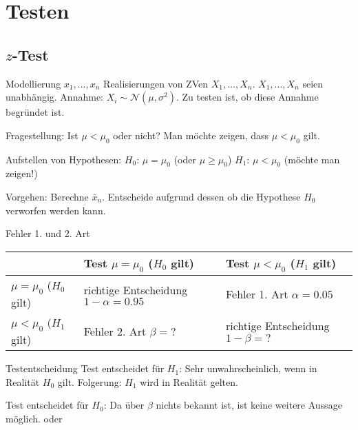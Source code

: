 \section{Testen}

\subsection{\(z\)-Test}

\begin{karte}{Modellierung}
\(x_1, \ldots, x_n\) Realisierungen von ZVen \(X_1, \ldots, X_n\). 
\(X_1, \ldots, X_n\) seien unabhängig. 
Annahme: \(X_i \sim \mathcal{N}(\mu, \sigma^2)\). Zu testen ist, ob diese Annahme begründet ist. 

Fragestellung: 
Ist \(\mu < \mu_0\) oder nicht?
Man möchte zeigen, dass \(\mu < \mu_0\) gilt. 

Aufstellen von Hypothesen: 
\(H_0\): \(\mu = \mu_0\) (oder \(\mu \geq \mu_0\))
\(H_1\): \(\mu < \mu_0\) (möchte man zeigen!)

Vorgehen: Berechne \(\bar{x}_n\). Entscheide aufgrund dessen ob die Hypothese \(H_0\) verworfen werden kann.
\end{karte}

\begin{karte}{Fehler 1. und 2. Art}
\begin{tabular}{p{15mm}||p{40mm}|p{40mm}}
& Test \(\mu = \mu_0\) \newline (\(H_0\) gilt) & Test \(\mu < \mu_0\) \newline (\(H_1\) gilt) \\
\hline
\(\mu = \mu_0\) \newline (\(H_0\) gilt) & richtige Entscheidung \newline \(1-\alpha=0.95\) & Fehler 1. Art \newline \(\alpha=0.05\) \\
\(\mu < \mu_0\) \newline (\(H_1\) gilt) & Fehler 2. Art \newline \(\beta=?\) & richtige Entscheidung \newline \(1-\beta = ?\)
\end{tabular}
\end{karte}

\begin{karte}{Testentscheidung}
Test entscheidet für \(H_1\): Sehr unwahrscheinlich, wenn in Realität \(H_0\) gilt. Folgerung: 
\(H_1\) wird in Realität gelten. 

Test entscheidet für \(H_0\): Da über \(\beta\) nichts bekannt ist, ist keine weitere Aussage möglich. 
 oder 
\end{karte}

